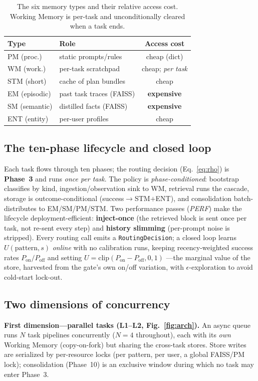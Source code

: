 \documentclass[10pt,twocolumn]{article}
\newcommand{\code}[1]{\texttt{\small #1}}
\begin{document}
\begin{table}[t]
\centering\small
\begin{tabular}{@{}llc@{}}
\toprule
Type & Role & Access cost \\
\midrule
PM (proc.)    & static prompts/rules        & cheap (dict) \\
WM (work.)    & per-task scratchpad         & cheap; \emph{per task} \\
STM (short)   & cache of plan bundles       & cheap \\
EM (episodic) & past task traces (FAISS)    & \textbf{expensive} \\
SM (semantic) & distilled facts (FAISS)     & \textbf{expensive} \\
ENT (entity)  & per-user profiles           & cheap \\
\bottomrule
\end{tabular}
\caption{The six memory types and their relative access cost. Working Memory is per-task and
unconditionally cleared when a task ends.}
\label{tab:types}
\end{table}

\subsection{The ten-phase lifecycle and closed loop}
Each task flows through ten phases; the routing decision (Eq.~\ref{eq:rho}) is \textbf{Phase~3} and
runs \emph{once per task}. The policy is \emph{phase-conditioned}: bootstrap classifies by kind,
ingestion/observation sink to WM, retrieval runs the cascade, storage is outcome-conditional
(success$\to$STM$+$ENT), and consolidation batch-distributes to EM/SM/PM/STM. Two performance passes
(\emph{PERF}) make the lifecycle deployment-efficient: \textbf{inject-once} (the retrieved block is
sent once per task, not re-sent every step) and \textbf{history slimming} (per-prompt noise is
stripped). Every routing call emits a \code{RoutingDecision}; a closed loop learns
$U(\text{pattern},s)$ \emph{online} with no calibration runs, keeping recency-weighted success rates
$P_{\mathrm{on}}/P_{\mathrm{off}}$ and setting $U=\mathrm{clip}(P_{\mathrm{on}}-P_{\mathrm{off}},0,1)$
---the marginal value of the store, harvested from the gate's own on/off variation, with
$\epsilon$-exploration to avoid cold-start lock-out.

\subsection{Two dimensions of concurrency}
\textbf{First dimension---parallel tasks (L1--L2, Fig.~\ref{fig:arch}).} An async queue runs $N$ task
pipelines concurrently ($N{=}4$ throughout), each with its \emph{own} Working Memory (copy-on-fork)
but sharing the cross-task stores. Store writes are serialized by per-resource locks (per pattern, per
user, a global FAISS/PM lock); consolidation (Phase~10) is an exclusive window during which no task may
enter Phase~3.
\end{document}
